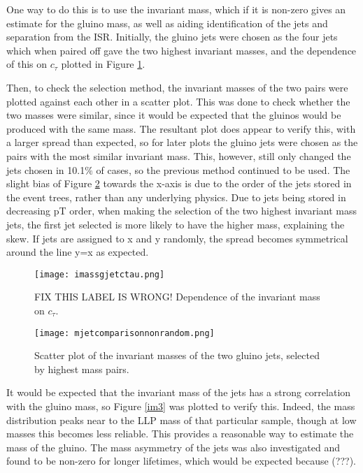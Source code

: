 \documentclass{article}
\begin{document}
One way to do this is to use the invariant mass, which if it is non-zero gives an estimate for the gluino mass, as well as aiding identification of the jets and separation from the ISR. Initially, the gluino jets were chosen as the four jets which when paired off gave the two highest invariant masses, and the dependence of this on $c_{\tau}$ plotted in Figure \ref{im1}.

Then, to check the selection method, the invariant masses of the two pairs were plotted against each other in a scatter plot. This was done to check whether the two masses were similar, since it would be expected that the gluinos would be produced with the same mass. The resultant plot does appear to verify this, with a larger spread than expected, so for later plots the gluino jets were chosen as the pairs with the most similar invariant mass. This, however, still only changed the jets chosen in 10.1$\%$ of cases, so the previous method continued to be used. The slight bias of Figure \ref{i2} towards the x-axis is due to the order of the jets stored in the event trees, rather than any underlying physics. Due to jets being stored in decreasing pT order, when making the selection of the two highest invariant mass jets, the first jet selected is more likely to have the higher mass, explaining the skew. If jets are assigned to x and y randomly, the spread becomes symmetrical around the line y=x as expected. 


\begin{figure}[H]
\centering
\texttt{[image: imassgjetctau.png]}
\caption{FIX THIS LABEL IS WRONG! Dependence of the invariant mass on $c_{\tau}$.}
	\label{im1}
\end{figure}

\begin{figure}[H]
\centering
\texttt{[image: mjetcomparisonnonrandom.png]}
\caption{Scatter plot of the invariant masses of the two gluino jets, selected by highest mass pairs.}
	\label{i2}
\end{figure}

It would be expected that the invariant mass of the jets has a strong correlation with the gluino mass, so Figure \ref{im3} was plotted to verify this. Indeed, the mass distribution peaks near to the LLP mass of that particular sample, though at low masses this becomes less reliable. This provides a reasonable way to estimate the mass of the gluino. The mass asymmetry of the jets was also investigated and found to be non-zero for longer lifetimes, which would be expected because (???). 
\end{document}
